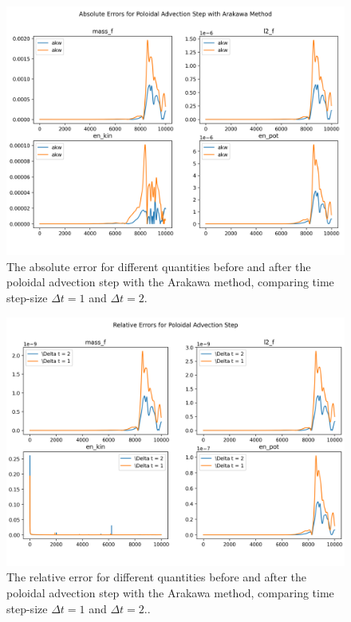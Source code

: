 \begin{figure}
	\centering
	\includegraphics[width=0.9\linewidth]{abs_err akw}
	\caption{The absolute error for different quantities before and after the poloidal advection step with the Arakawa method, comparing time step-size $\Delta t = 1$ and $\Delta t = 2$.}
	\label{fig:abserr_akw}
\end{figure}


\begin{figure}
	\centering
	\includegraphics[width=0.9\linewidth]{rel_err akw}
	\caption{The relative error for different quantities before and after the poloidal advection step with the Arakawa method, comparing time step-size $\Delta t = 1$ and $\Delta t = 2$..}
	\label{fig:relerr_akw}
\end{figure}


